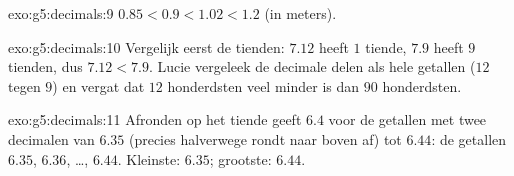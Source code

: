 \begin{solution}{exo:g5:decimals:9}
$0.85 < 0.9 < 1.02 < 1.2$ (in meters).
\end{solution}

\begin{solution}{exo:g5:decimals:10}
Vergelijk eerst de tienden: $7.12$ heeft $1$ tiende, $7.9$ heeft $9$
tienden, dus $7.12 < 7.9$. Lucie vergeleek de decimale delen als hele
getallen ($12$ tegen $9$) en vergat dat $12$ honderdsten veel minder is dan
$90$ honderdsten.
\end{solution}

\begin{solution}{exo:g5:decimals:11}
Afronden op het tiende geeft $6.4$ voor de getallen met twee decimalen van
$6.35$ (precies halverwege rondt naar boven af) tot $6.44$: de getallen
$6.35$, $6.36$, \dots, $6.44$. Kleinste: $6.35$; grootste: $6.44$.
\end{solution}
